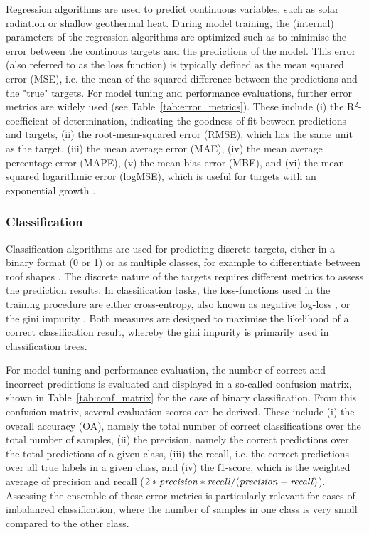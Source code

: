 Regression algorithms are used to predict continuous variables, such as solar radiation or shallow geothermal heat. 
During model training, the (internal) parameters of the regression algorithms are optimized such as to minimise the error between the continous targets and the predictions of the model.
This error (also referred to as the loss function) is typically defined as the mean squared error (MSE), i.e. the mean of the squared difference between the predictions and the "true" targets.
%
For model tuning and performance evaluations, further error metrics are widely used (see Table~\ref{tab:error_metrics}).
These include (i) the R$^2$-coefficient of determination, indicating the goodness of fit between predictions and targets, (ii) the root-mean-squared error (RMSE), which has the same unit as the target, (iii) the mean average error (MAE), (iv) the mean average percentage error (MAPE), (v) the mean bias error (MBE), and (vi) the mean squared logarithmic error (logMSE), which is useful for targets with an exponential growth \cite{pedregosa_scikit-learn:_2011}.


\subsubsection{Classification}
Classification algorithms are used for predicting discrete targets, either in a binary format (0 or 1) or as multiple classes, for example to differentiate between roof shapes \cite{mohajeri_city-scale_2018}.
The discrete nature of the targets requires different metrics to assess the prediction results. 
In classification tasks, the loss-functions used in the training procedure are either cross-entropy, also known as negative log-loss \cite{bishop_pattern_2006}, or the gini impurity \cite{breiman_classification_1984}. Both measures are designed to maximise the likelihood of a correct classification result, whereby the gini impurity is primarily used in classification trees.

For model tuning and performance evaluation, the number of correct and incorrect predictions is evaluated and displayed in a so-called confusion matrix, shown in Table~\ref{tab:conf_matrix} for the case of binary classification. From this confusion matrix, several evaluation scores can be derived. These include (i) the overall accuracy (OA), namely the total number of correct classifications over the total number of samples, (ii) the precision, namely the correct predictions over the total predictions of a given class, (iii) the recall, i.e. the correct predictions over all true labels in a given class, and (iv) the f1-score, which is the weighted average of precision and recall ($2*\text{\textit{precision}}*\text{\textit{recall}}/(\text{\textit{precision}}+\text{\textit{recall}})$).
Assessing the ensemble of these error metrics is particularly relevant for cases of imbalanced classification, where the number of samples in one class is very small compared to the other class. 
 
